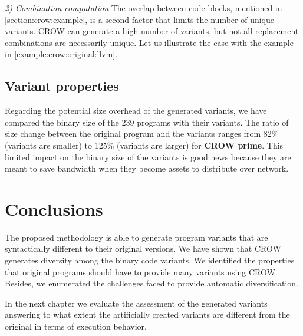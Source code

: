 
\emph{2) Combination computation}  The overlap between code blocks, mentioned in \autoref{section:crow:example}, is a second factor that limits the number of unique variants. CROW can generate a high number of variants, but not all replacement combinations are necessarily unique. Let us illustrate the case with the example in \autoref{example:crow:original:llvm}.



\subsection{Variant properties}

Regarding the potential size overhead of the generated variants, we have compared the \wasm binary size of the 239 programs with their variants. The ratio of size change between the original program and the variants ranges from 82\% (variants are smaller) to 125\% (variants are larger) for \textbf{CROW prime}. This limited impact on the binary size of the variants is good news because they are meant to save bandwidth when they become assets to distribute over network.



\section{Conclusions}

The proposed methodology is able to generate program variants that are syntactically different to their original versions. We have shown that CROW generates diversity among the binary code variants. We identified the properties that original programs should have to provide many variants using CROW. Besides, we enumerated the challenges faced to provide automatic diversification.

In the next chapter we evaluate the assessment of the generated variants answering to what extent the artificially created variants are different from the original in terms of execution behavior.